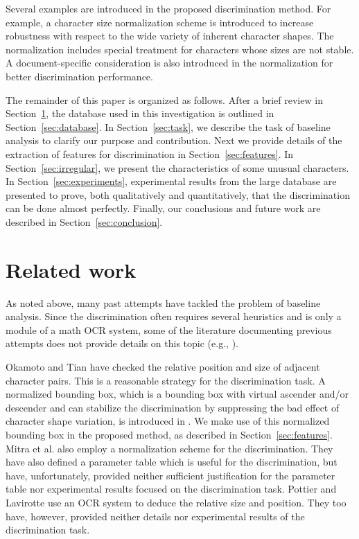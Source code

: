 \documentclass[10pt]{article}
\begin{document}
Several examples are introduced in the proposed discrimination method. For example, a character size normalization scheme is introduced to increase robustness with respect to the wide variety of inherent character shapes. The normalization includes special treatment for characters whose sizes are not stable. A document-specific consideration is also introduced in the normalization for better discrimination performance.

The remainder of this paper is organized as follows. After a brief review in Section~\ref{sec:related}, the database used in this investigation is outlined in Section~\ref{sec:database}. In Section~\ref{sec:task}, we describe the task of baseline analysis to clarify our purpose and contribution. Next we provide details of the extraction of features for discrimination in Section~\ref{sec:features}. In Section~\ref{sec:irregular}, we present the characteristics of some unusual characters. In Section~\ref{sec:experiments}, experimental results from the large database are presented to prove, both qualitatively and quantitatively, that the discrimination can be done almost perfectly. Finally, our conclusions and future work are described in Section~\ref{sec:conclusion}.

\section{Related work}
\label{sec:related}
As noted above, many past attempts have tackled the problem of baseline analysis. Since the discrimination often requires several heuristics and is only a module of a math OCR system, some of the literature documenting previous attempts does not provide details on this topic (e.g., \cite{Blostein1997, Ha1995, Guo2007}).

Okamoto \cite{Okamoto1991} and Tian \cite{Tian2005} have checked the relative position and size of adjacent character pairs. This is a reasonable strategy for the discrimination task. A normalized bounding box, which is a bounding box with virtual ascender and/or descender and can stabilize the discrimination by suppressing the bad effect of character shape variation, is introduced in \cite{Twaakvondo1995}. We make use of this normalized bounding box in the proposed method, as described in Section~\ref{sec:features}. Mitra et al. \cite{Mitra2003} also employ a normalization scheme for the discrimination. They have also defined a parameter table which is useful for the discrimination, but have, unfortunately, provided neither sufficient justification for the parameter table nor experimental results focused on the discrimination task. Pottier and Lavirotte \cite{Lavirotte1997} use an OCR system to deduce the relative size and position. They too have, however, provided neither details nor experimental results of the discrimination task.
\end{document}
